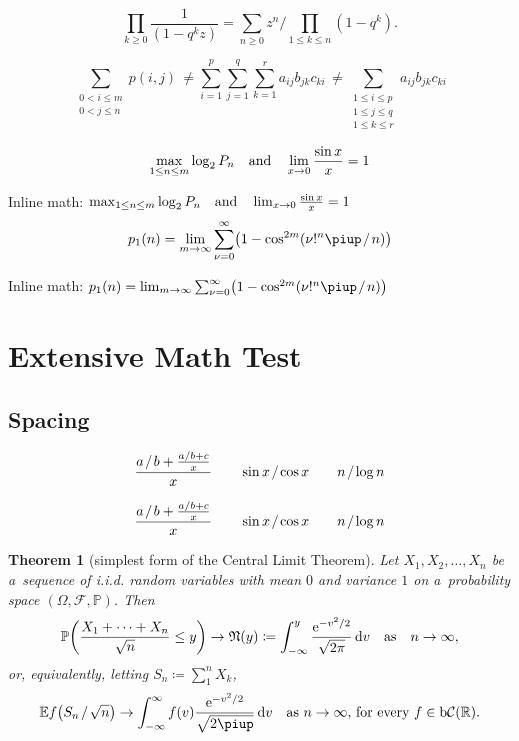 \documentclass[11pt, a4paper, oneside]{article}
\newcommand{\mathup}[1]{\mathrm{#1}}
\newcommand*{\divslash}{%
	\mathbin{%
		\nonscript\mskip-2mu / \nonscript\mskip-2mu%
	}%
}  %
\theoremstyle{Plain}
\newtheorem{theorem}{Theorem}
\theoremstyle{Definition}
\theoremstyle{Remark}
\begin{document}
\begin{appendix}

	$$\prod_{k\ge0}\frac{1}{(1-q^kz)}=
	\sum_{n\ge0}z^n \bigg/ \!\!\prod_{1\le k\le n}(1-q^k).$$

	$$\sum_{\substack{\scriptstyle 0< i\le m\\\scriptstyle0<j\le n}}p(i,j) \,\ne
	\sum_{i=1}^p \sum_{j=1}^q \sum_{k=1}^r a_{ij} b_{jk} c_{ki} \,\ne
	\sum_{\substack{\scriptstyle 1\le i\le p \\ \scriptstyle 1\le j\le q\\
			\scriptstyle 1\le k\le r}} a_{ij} b_{jk} c_{ki}$$

	\medskip
	$$\max_{1\le n\le m}\log_2P_n \quad \hbox{and} \quad
	\lim_{x\to0}\frac{\sin x}{x}=1$$

	\medskip
	Inline math:
	$\max_{1\le n\le m}\log_2P_n \quad \hbox{and} \quad
	\lim_{x\to0}\frac{\sin x}{x}=1$
	$$p_1(n)=\lim_{m\to\infty}\sum_{\nu=0}^\infty\bigl(1-\cos^{2m}(\nu!^n\piup \divslash n)\bigr)$$

	\medskip
	Inline math:
	$p_1(n)=\lim_{m\to\infty}\sum_{\nu=0}^\infty\bigl(1-\cos^{2m}(\nu!^n\piup \divslash n)\bigr)$

	\endgroup

	\clearpage

	\section{Extensive Math Test \showfamily}

	\subsection{Spacing}

	$$\frac{a \divslash b + \frac{a \divslash b + c}{x}}{x} \qquad \sin x \divslash \cos x \qquad n \divslash \log n$$

	{\boldmath $$\frac{a \divslash b + \frac{a \divslash b + c}{x}}{x} \qquad \sin x \divslash \cos x \qquad n \divslash \log n$$}

	\begin{theorem}[simplest form of the Central Limit Theorem]
		\label{theorem:SFCLT}
		Let $X_1, X_2, \ldots, X_n$ be a~sequence of i.i.d. random variables with mean $0$
		and variance $1$ on a~probability space $(\Omega, \mathcal{F}, \mathbb{P})$. Then
		\[
			\mathbb{P}{\left(\frac{X_1+\cdots+X_n}{\sqrt{n}}\le y\right)} \to
			\mathfrak{N}(y) \coloneq
			\int_{-\infty}^y \frac{\mathup{e}^{-v^2 \divslash 2}}{\sqrt{2\mathup{\pi}}}\,\mathup{d}v
			\quad\text{as} \quad n\to\infty,
		\]
		or, equivalently, letting $S_n \coloneq \sum_1^n X_k$,
		\[
			\mathbb{E} f \big( S_n \divslash \sqrt{n} \big) \to
			\int_{-\infty}^\infty f(v) \frac{\mathup{e}^{-v^2 \divslash 2}}{\sqrt{2\piup}}\,\mathup{d}v
			\quad \mbox{as $n\to\infty$, for every $f \in \mathup{b}\mathcal{C}(\mathbb{R})$.}
		\]
	\end{theorem}


\end{appendix}
\end{document}
